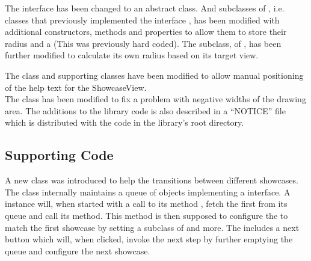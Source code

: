 The interface  has been changed to an abstract class. And subclasses of , i.e. classes that previously implemented the interface , has been modified with additional constructors, methods and properties to allow them to store their radius and a  (This was previously hard coded). The  subclass, of , has been further modified to calculate its own radius based on its target view.  

The  class and supporting classes have been modified to allow manual positioning of the help text for the ShowcaseView.\\ 
The  class has been modified to fix a problem with negative widths of the drawing area.
The additions to the library code is also described in a ``NOTICE'' file which is distributed with the code in the library's root directory. 

\subsection{Supporting Code}

A new class  was introduced to help the transitions between different showcases. The class internally maintains a queue of objects implementing a  interface. A  instance will, when started with a call to its method , fetch the first  from its queue and call its  method. This  method is then supposed to configure the  to match the first showcase by setting a subclass of  and more. The  includes a next button which will, when clicked, invoke the next step by further emptying the queue and configure the next showcase.




